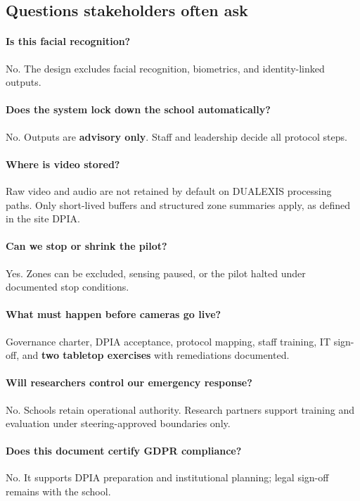 \subsection{Questions stakeholders often ask}

\paragraph{Is this facial recognition?}
No. The design excludes facial recognition, biometrics, and identity-linked outputs.

\paragraph{Does the system lock down the school automatically?}
No. Outputs are \textbf{advisory only}. Staff and leadership decide all protocol steps.

\paragraph{Where is video stored?}
Raw video and audio are not retained by default on DUALEXIS processing paths.
Only short-lived buffers and structured zone summaries apply, as defined in the site DPIA.

\paragraph{Can we stop or shrink the pilot?}
Yes. Zones can be excluded, sensing paused, or the pilot halted under documented stop conditions.

\paragraph{What must happen before cameras go live?}
Governance charter, DPIA acceptance, protocol mapping, staff training, IT sign-off, and
\textbf{two tabletop exercises} with remediations documented.

\paragraph{Will researchers control our emergency response?}
No. Schools retain operational authority. Research partners support training and evaluation
under steering-approved boundaries only.

\paragraph{Does this document certify GDPR compliance?}
No. It supports DPIA preparation and institutional planning; legal sign-off remains with the school.

